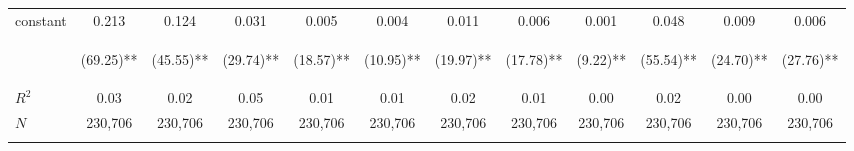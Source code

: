 \begin{tabular}{lccccccccccc}
\noalign{\smallskip}constant & 0.213 & 0.124 & 0.031 & 0.005 & 0.004 & 0.011 & 0.006 & 0.001 & 0.048 & 0.009 & 0.006\\
 & \begin{footnotesize}(69.25)**\end{footnotesize} & \begin{footnotesize}(45.55)**\end{footnotesize} & \begin{footnotesize}(29.74)**\end{footnotesize} & \begin{footnotesize}(18.57)**\end{footnotesize} & \begin{footnotesize}(10.95)**\end{footnotesize} & \begin{footnotesize}(19.97)**\end{footnotesize} & \begin{footnotesize}(17.78)**\end{footnotesize} & \begin{footnotesize}(9.22)**\end{footnotesize} & \begin{footnotesize}(55.54)**\end{footnotesize} & \begin{footnotesize}(24.70)**\end{footnotesize} & \begin{footnotesize}(27.76)**\end{footnotesize}\\
\noalign{\smallskip}$R^2$ & 0.03 & 0.02 & 0.05 & 0.01 & 0.01 & 0.02 & 0.01 & 0.00 & 0.02 & 0.00 & 0.00\\
$N$ & 230,706 & 230,706 & 230,706 & 230,706 & 230,706 & 230,706 & 230,706 & 230,706 & 230,706 & 230,706 & 230,706\\
\noalign{\smallskip}\hline\hline\end{tabular}
